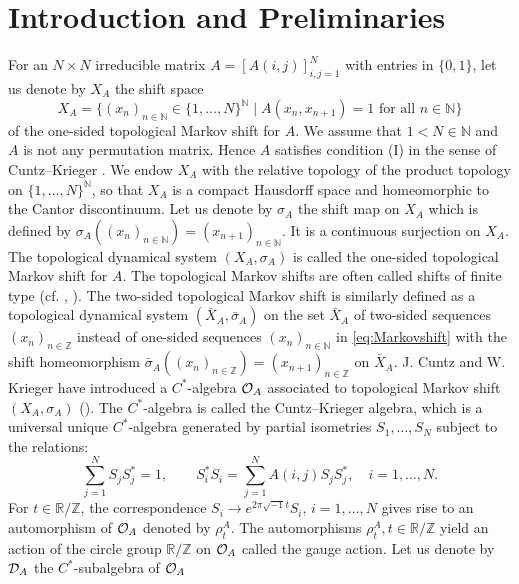 \documentclass[11pt]{article}
\theoremstyle{plain}
\theoremstyle{definition}
\numberwithin{equation}{section}
\newcommand{\N}{\mathbb{N}}
\newcommand{\RZ}{\mathbb{R}/{\mathbb{Z}}}
\newcommand{\Z}{\mathbb{Z}}
\begin{document}
\section{Introduction and Preliminaries}


For an $N\times N$ irreducible matrix
$A=[A(i,j)]_{i,j=1}^N$ 
with entries in $\{0,1\}$,
let us denote by 
$X_A$ the shift space 
\begin{equation}
X_A = \{ (x_n )_{n \in \N} \in \{1,\dots,N \}^{\N}
\mid
A(x_n,x_{n+1}) =1 \text{ for all } n \in {\N}
\} \label{eq:Markovshift}
\end{equation}
of the one-sided topological Markov shift for $A$.
We assume that 
$1< N \in {\N}$
and
$A$ is not any permutation matrix.
Hence 
$A$  satisfies condition (I) in the sense of Cuntz--Krieger \cite{CK}.
We endow $X_A$ with the relative topology 
of the product topology
on $\{1,\dots,N\}^{\N}$, so that 
$X_A$ is a compact Hausdorff space  
and homeomorphic to the Cantor discontinuum.
Let us denote by
$\sigma_A$ 
the shift map on $X_A$ which is defined by 
$\sigma_{A}((x_n)_{n \in {\N}})=(x_{n+1} )_{n \in \N}$.
It is a continuous surjection on $X_A$.
The topological dynamical system 
$(X_A, \sigma_A)$ is called the one-sided topological Markov shift for $A$.
The topological Markov shifts are often called 
shifts of finite type (cf. \cite{Kitchens}, \cite{LM}).
The two-sided topological Markov shift
is similarly defined as a topological 
dynamical system
$(\bar{X}_A, \bar{\sigma}_A)$
on the set $\bar{X}_A$
of two-sided
sequences 
$(x_n)_{n \in \Z}$ 
instead of one-sided sequences 
$(x_n )_{n \in \N}$ in \eqref{eq:Markovshift}
with the shift homeomorphism
$\bar{\sigma}_{A}((x_n)_{n \in {\Z}})=(x_{n+1} )_{n \in \Z}$
on 
$\bar{X}_A$.
J. Cuntz and W. Krieger have introduced a $C^*$-algebra 
${{\mathcal{O}}_A}$ associated to topological Markov shift $(X_A,\sigma_A)$
(\cite{CK}).
The $C^*$-algebra is called the Cuntz--Krieger algebra,
which is a universal unique $C^*$-algebra generated by
partial isometries
$S_1,\dots,S_N$
subject to the relations:
\begin{equation} 
\sum_{j=1}^N S_j S_j^* = 1, \qquad
S_i^* S_i = \sum_{j=1}^N A(i,j) S_jS_j^*, \quad i=1,\dots,N. \label{eq:CK}
\end{equation} 
For $t \in \RZ$,
the correspondence
$S_i \rightarrow e^{2 \pi\sqrt{-1}t}S_i,
\, i=1,\dots,N$
gives rise to an automorphism
of ${{\mathcal{O}}_A}$ denoted by
$\rho^A_t$.
The automorphisms
$\rho^A_t, t \in \RZ$
yield an action of the circle group $\RZ$
on ${{\mathcal{O}}_A}$ called the gauge action.
Let us denote by ${{\mathcal{D}}_A}$ the $C^*$-subalgebra of ${{\mathcal{O}}_A}$
\end{document}
